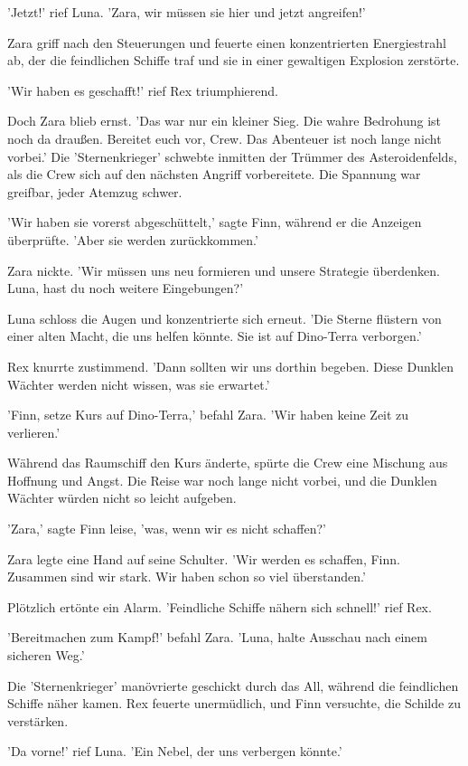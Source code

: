 \documentclass[12pt]{article}
\begin{document}
'Jetzt!' rief Luna. 'Zara, wir müssen sie hier und jetzt angreifen!'

Zara griff nach den Steuerungen und feuerte einen konzentrierten Energiestrahl ab, der die feindlichen Schiffe traf und sie in einer gewaltigen Explosion zerstörte.

'Wir haben es geschafft!' rief Rex triumphierend.

Doch Zara blieb ernst. 'Das war nur ein kleiner Sieg. Die wahre Bedrohung ist noch da draußen. Bereitet euch vor, Crew. Das Abenteuer ist noch lange nicht vorbei.' Die 'Sternenkrieger' schwebte inmitten der Trümmer des Asteroidenfelds, als die Crew sich auf den nächsten Angriff vorbereitete. Die Spannung war greifbar, jeder Atemzug schwer.

'Wir haben sie vorerst abgeschüttelt,' sagte Finn, während er die Anzeigen überprüfte. 'Aber sie werden zurückkommen.'

Zara nickte. 'Wir müssen uns neu formieren und unsere Strategie überdenken. Luna, hast du noch weitere Eingebungen?'

Luna schloss die Augen und konzentrierte sich erneut. 'Die Sterne flüstern von einer alten Macht, die uns helfen könnte. Sie ist auf Dino-Terra verborgen.'

Rex knurrte zustimmend. 'Dann sollten wir uns dorthin begeben. Diese Dunklen Wächter werden nicht wissen, was sie erwartet.'

'Finn, setze Kurs auf Dino-Terra,' befahl Zara. 'Wir haben keine Zeit zu verlieren.'

Während das Raumschiff den Kurs änderte, spürte die Crew eine Mischung aus Hoffnung und Angst. Die Reise war noch lange nicht vorbei, und die Dunklen Wächter würden nicht so leicht aufgeben.

'Zara,' sagte Finn leise, 'was, wenn wir es nicht schaffen?'

Zara legte eine Hand auf seine Schulter. 'Wir werden es schaffen, Finn. Zusammen sind wir stark. Wir haben schon so viel überstanden.'

Plötzlich ertönte ein Alarm. 'Feindliche Schiffe nähern sich schnell!' rief Rex.

'Bereitmachen zum Kampf!' befahl Zara. 'Luna, halte Ausschau nach einem sicheren Weg.'

Die 'Sternenkrieger' manövrierte geschickt durch das All, während die feindlichen Schiffe näher kamen. Rex feuerte unermüdlich, und Finn versuchte, die Schilde zu verstärken.

'Da vorne!' rief Luna. 'Ein Nebel, der uns verbergen könnte.'
\end{document}
